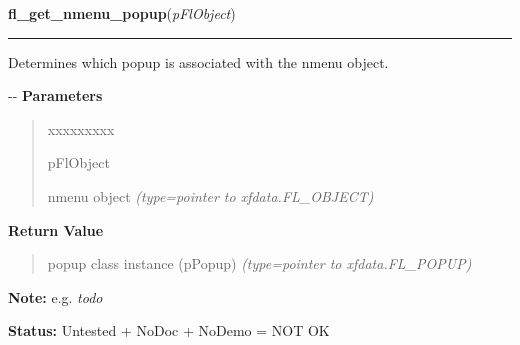     \label{xformslib:flnmenu:fl_get_nmenu_popup}

    \vspace{0.5ex}

\hspace{.8\funcindent}\begin{boxedminipage}{\funcwidth}

    \raggedright \textbf{fl\_get\_nmenu\_popup}(\textit{pFlObject})

    \vspace{-1.5ex}

    \rule{\textwidth}{0.5\fboxrule}
\setlength{\parskip}{2ex}

Determines which popup is associated with the nmenu object.

-{}-
\setlength{\parskip}{1ex}
      \textbf{Parameters}
      \vspace{-1ex}

      \begin{quote}
        \begin{Ventry}{xxxxxxxxx}

          \item[pFlObject]


nmenu object
            {\it (type=pointer to xfdata.FL\_OBJECT)}

        \end{Ventry}

      \end{quote}

      \textbf{Return Value}
    \vspace{-1ex}

      \begin{quote}

popup class instance (pPopup)
      {\it (type=pointer to xfdata.FL\_POPUP)}

      \end{quote}

\textbf{Note:} 
e.g. \emph{todo}


\textbf{Status:} 
Untested + NoDoc + NoDemo = NOT OK


    \end{boxedminipage}

    \label{xformslib:flnmenu:fl_set_nmenu_popup}

